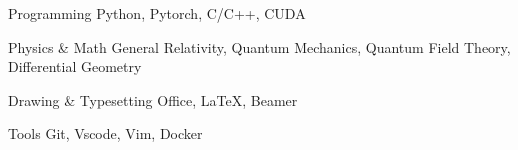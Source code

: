 \begin{cvskills}

  \cvskill
  {Programming} %
  {Python, Pytorch, C/C++, CUDA} %

  \cvskill
  {Physics \& Math} %
  {General Relativity, Quantum Mechanics, Quantum Field Theory, Differential Geometry} %

  \cvskill
  {Drawing \& Typesetting} %
  {Office, \textrm{\LaTeX}, Beamer} %

  \cvskill
  {Tools} %
  {Git, Vscode, Vim, Docker} %
\end{cvskills}

